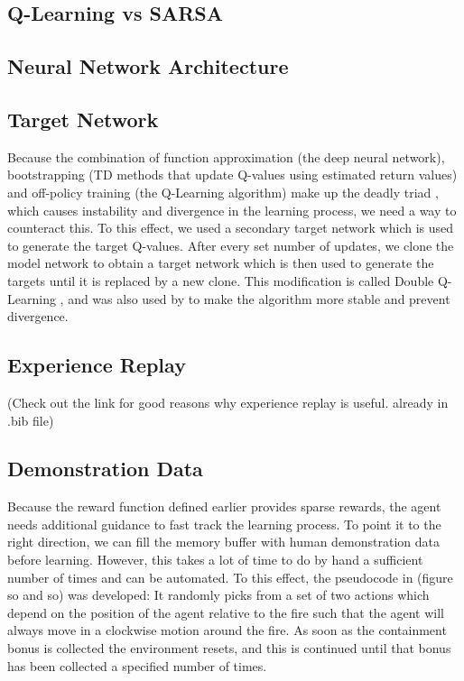 \subsection{Q-Learning vs SARSA}\label{sec:q_sarsa}

\subsection{Neural Network Architecture}\label{sec:architecture}

\subsection{Target Network}\label{sec:target_network}
Because the combination of function approximation (the deep neural network), bootstrapping (TD methods that update Q-values using estimated return values) and off-policy training (the Q-Learning algorithm) make up the deadly triad \citep{sutton_barto_2018}, which causes instability and divergence in the learning process, we need a way to counteract this. To this effect, we used a secondary target network which is used to generate the target Q-values. After every set number of updates, we clone the model network to obtain a target network which is then used to generate the targets until it is replaced by a new clone. This modification is called Double Q-Learning \citep{NIPS2010_3964}, and was also used by \citep{mnih2015human} to make the algorithm more stable and prevent divergence.

\subsection{Experience Replay}\label{sec:exp_replay}
(Check out the link for good reasons why experience replay is useful. already in .bib file)

\subsection{Demonstration Data}\label{sec:demo_data}
Because the reward function defined earlier provides sparse rewards, the agent needs additional guidance to fast track the learning process. To point it to the right direction, we can fill the memory buffer with human demonstration data before learning. However, this takes a lot of time to do by hand a sufficient number of times and can be automated. To this effect, the pseudocode in (figure so and so) was developed: It randomly picks from a set of two actions which depend on the position of the agent relative to the fire such that the agent will always move in a clockwise motion around the fire. As soon as the containment bonus is collected the environment resets, and this is continued until that bonus has been collected a specified number of times.
